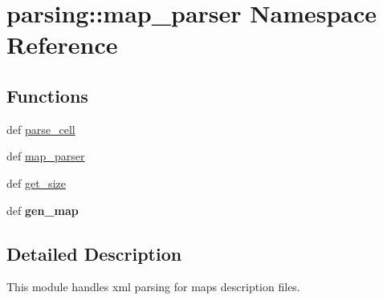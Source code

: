 \hypertarget{namespaceparsing_1_1map__parser}{\section{parsing\-:\-:map\-\_\-parser \-Namespace \-Reference}
\label{namespaceparsing_1_1map__parser}
}
\subsection*{\-Functions}
\begin{DoxyCompactItemize}
\item 
def \hyperlink{namespaceparsing_1_1map__parser_ac95058862719a1ab0d4f1edcab61c34a}{parse\-\_\-cell}
\item 
def \hyperlink{namespaceparsing_1_1map__parser_a51e06bfd8a212d3ff282d77f9d9e642c}{map\-\_\-parser}
\item 
def \hyperlink{namespaceparsing_1_1map__parser_abb78539632307bd1f6f2542ac3cb2534}{get\-\_\-size}
\item 
\hypertarget{namespaceparsing_1_1map__parser_a03a4b3330d705fec56dc1176a2db6839}{def {\bfseries gen\-\_\-map}}\label{namespaceparsing_1_1map__parser_a03a4b3330d705fec56dc1176a2db6839}

\end{DoxyCompactItemize}


\subsection{\-Detailed \-Description}
\begin{DoxyVerb}
This module handles xml parsing for maps description files.
\end{DoxyVerb}
 

